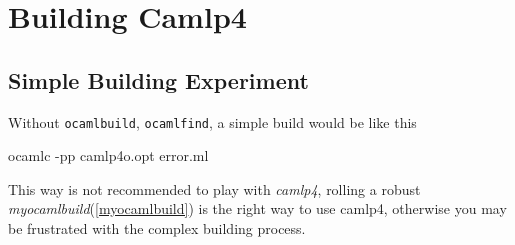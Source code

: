 
\section{Building Camlp4}
\label{sec:building-camlp4}


\subsection{Simple Building Experiment}

Without \verb|ocamlbuild|, \verb|ocamlfind|, a simple build would be
like this

\begin{bashcode}
ocamlc -pp camlp4o.opt error.ml
\end{bashcode}  

This way is not recommended to play with \textit{camlp4}, rolling a
robust \textit{myocamlbuild}(\ref{myocamlbuild}) is the right way to
use camlp4, otherwise you may be frustrated with the complex building
process.
